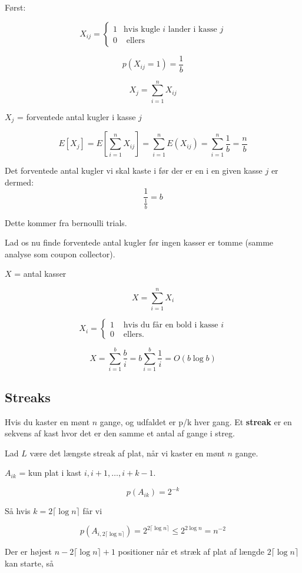 \documentclass[11pt]{article}
\theoremstyle{definition}
\theoremstyle{remark}
\begin{document}
Først:

\[
X_{ij} = \begin{cases}
  1 & \text{hvis kugle } i \text{ lander i kasse } j\\
  0 & \text{ ellers}
\end{cases}
\]

\[
p(X_{ij}=1) = \frac{1}{b}
\]

\[
X_{j} = \sum_{i=1}^{n} X_{ij}
\]

$X_{j}$ = forventede antal kugler i kasse $j$


\[
E[X_{j}] = E[\sum_{i=1}^{n}X_{ij}] = \sum_{i=1}^{n} E(X_{ij}) = \sum_{i=1}^{n} \frac{1}{b} = \frac{n}{b}
\]


Det forventede antal kugler vi skal kaste i før der er en i en given kasse $j$ er dermed:
\[
\frac{1}{\frac{1}{b}} = b
\]

Dette kommer fra bernoulli trials.

Lad os nu finde forventede antal kugler før ingen kasser er tomme (samme analyse som coupon collector).

$X$ = antal kasser

\[
X = \sum_{i=1}^{n}X_{i}
\]

\[
X_{i} = \begin{cases}
  1 & \text{ hvis  du får en bold i kasse }i \\
  0 & \text{ ellers.}
\end{cases}
\]

\[
X = \sum_{i=1}^{b} \frac{b}{i} = b \sum_{i=1}^{b} \frac{1}{i} = O(b \log b)
\]


\subsection{Streaks}
\label{subsec:label}

Hvis du kaster en mønt $n$ gange, og udfaldet er p/k hver gang. Et \textbf{streak} er en sekvens af kast hvor det er den samme et antal af gange i streg.

Lad $L$ være det længste streak af plat, når vi kaster en mønt $n$ gange.

$A_{ik}$ = kun plat i kast $i, i+1, \ldots, i+k-1$.

\[
p(A_{ik}) = 2^{-k}
\]


Så hvis $k = 2 \lceil \log n \rceil $ får vi

\[
p(A_{i, 2 \lceil \log n \rceil}) = 2^{2 \lceil \log n \rceil} \leq 2^{2 \log n} = n^{-2}
\]

Der er højest $n - 2 \lceil \log n \rceil  + 1$ positioner når et stræk af plat af længde $2 \lceil \log n \rceil$ kan starte, så
\end{document}
